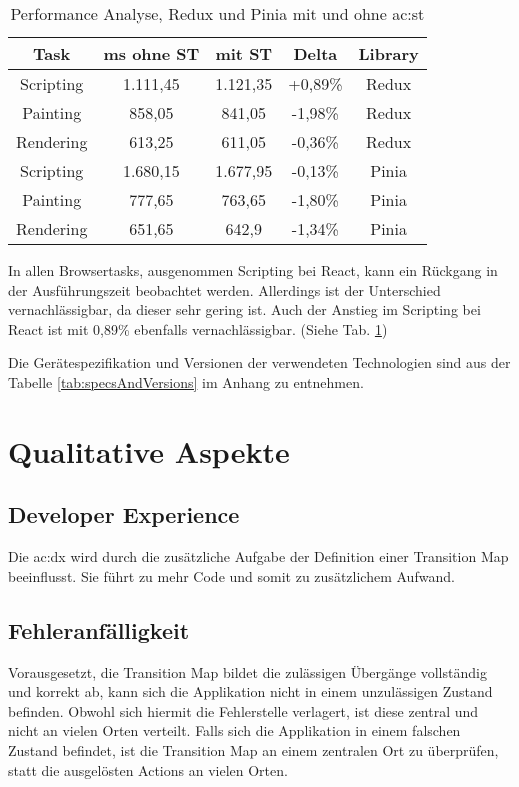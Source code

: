 \begin{table}[!ht]
  \caption{Performance Analyse, Redux und Pinia mit und ohne \acrshort{ac:st}}
  \label{tab:performanceAnalysisSTvsNoST}

  \begin{center}
    \begin{tabular}{|c|c|c|c|c|} 
    \hline
    Task & ms ohne ST & mit ST & Delta & Library \\ [0.5ex]
    \hline\hline
    Scripting & 1.111,45 & 1.121,35 & +0,89\% & Redux \\
    \hline
    Painting & 858,05 & 841,05 & -1,98\% & Redux \\
    \hline
    Rendering & 613,25 & 611,05 & -0,36\% & Redux \\
    \hline
    Scripting & 1.680,15 & 1.677,95 & -0,13\% & Pinia \\
    \hline
    Painting & 777,65 & 763,65 & -1,80\% & Pinia \\
    \hline
    Rendering & 651,65 & 642,9 & -1,34\% & Pinia \\
    \hline
    \end{tabular}
  \end{center}
\end{table}

In allen Browsertasks, ausgenommen Scripting bei React, kann ein Rückgang in der Ausführungszeit beobachtet werden. Allerdings ist der Unterschied vernachlässigbar, da dieser sehr gering ist. Auch der Anstieg im Scripting bei React ist mit 0,89\% ebenfalls vernachlässigbar. (Siehe Tab. \ref{tab:performanceAnalysisSTvsNoST})

Die Gerätespezifikation und Versionen der verwendeten Technologien sind aus der Tabelle \ref{tab:specsAndVersions} im Anhang zu entnehmen.

\section{Qualitative Aspekte}

\subsection{Developer Experience}
Die \acrshort{ac:dx} wird durch die zusätzliche Aufgabe der Definition einer Transition Map beeinflusst. Sie führt zu mehr Code und somit zu zusätzlichem Aufwand.


\subsection{Fehleranfälligkeit}
Vorausgesetzt, die Transition Map bildet die zulässigen Übergänge vollständig und korrekt ab, kann sich die Applikation nicht in einem unzulässigen Zustand befinden. Obwohl sich hiermit die Fehlerstelle verlagert, ist diese zentral und nicht an vielen Orten verteilt. Falls sich die Applikation in einem falschen Zustand befindet, ist die Transition Map an einem zentralen Ort zu überprüfen, statt die ausgelösten Actions an vielen Orten.

